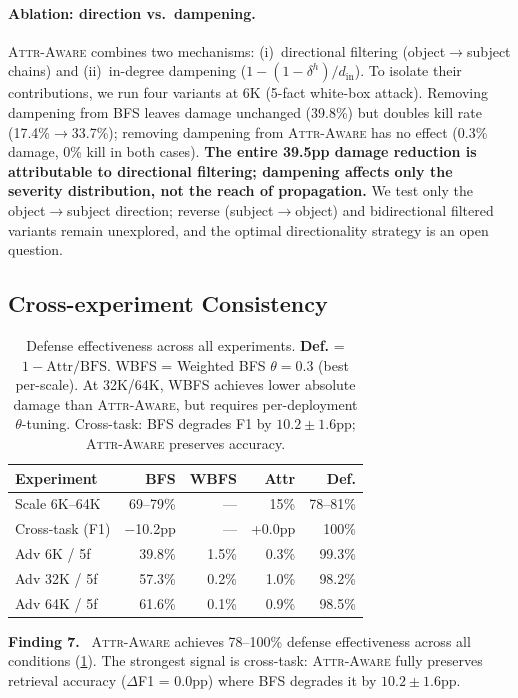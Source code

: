 \documentclass{article}
\newcommand{\attraware}{\textsc{Attr-Aware}}
\newcommand{\finding}[1]{\vspace{2pt}\noindent\textbf{Finding #1.}~}
\begin{document}
\paragraph{Ablation: direction vs.\ dampening.}
\attraware{} combines two mechanisms: (i)~directional filtering (object$\rightarrow$subject chains) and (ii)~in-degree dampening ($1 - (1-\delta^h)/d_{\text{in}}$).
To isolate their contributions, we run four variants at 6K (5-fact white-box attack).
Removing dampening from BFS leaves damage unchanged (39.8\%) but doubles kill rate (17.4\%$\rightarrow$33.7\%);
removing dampening from \attraware{} has no effect (0.3\% damage, 0\% kill in both cases).
\textbf{The entire 39.5pp damage reduction is attributable to directional filtering; dampening affects only the severity distribution, not the reach of propagation.}
We test only the object$\rightarrow$subject direction; reverse (subject$\rightarrow$object) and bidirectional filtered variants remain unexplored, and the optimal directionality strategy is an open question.

\subsection{Cross-experiment Consistency}

\begin{table}[htbp]
\centering
\footnotesize
\begin{tabular}{lrrrr}
\toprule
\textbf{Experiment} & \textbf{BFS} & \textbf{WBFS} & \textbf{Attr} & \textbf{Def.} \\
\midrule
Scale 6K--64K & 69--79\% & --- & 15\% & 78--81\% \\
Cross-task (F1) & $-$10.2pp & --- & +0.0pp & 100\% \\
Adv 6K / 5f & 39.8\% & 1.5\% & 0.3\% & 99.3\% \\
Adv 32K / 5f & 57.3\% & 0.2\% & 1.0\% & 98.2\% \\
Adv 64K / 5f & 61.6\% & 0.1\% & 0.9\% & 98.5\% \\
\bottomrule
\end{tabular}
\caption{Defense effectiveness across all experiments. \textbf{Def.} = $1 - \text{Attr}/\text{BFS}$. WBFS = Weighted BFS $\theta{=}0.3$ (best per-scale). At 32K/64K, WBFS achieves lower absolute damage than \attraware{}, but requires per-deployment $\theta$-tuning. Cross-task: BFS degrades F1 by $10.2\pm1.6$pp; \attraware{} preserves accuracy.}
\label{tab:defense_all}
\end{table}

\finding{7} \attraware{} achieves 78--100\% defense effectiveness across all conditions (\cref{tab:defense_all}).
The strongest signal is cross-task: \attraware{} fully preserves retrieval accuracy ($\Delta$F1 = 0.0pp) where BFS degrades it by $10.2\pm1.6$pp.
\end{document}
